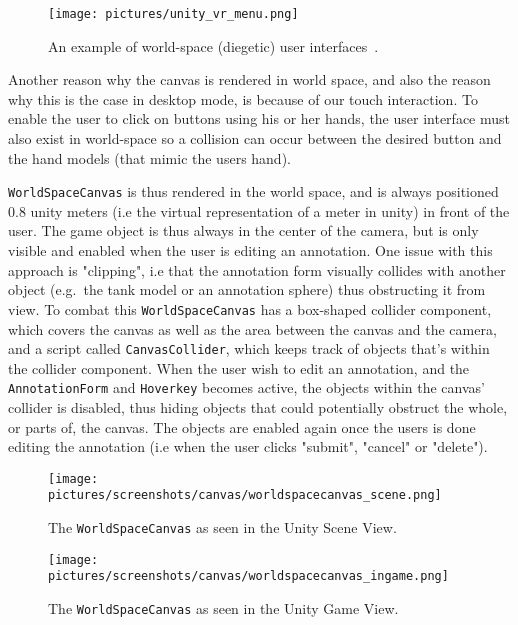 \begin{figure}%
	\texttt{[image: pictures/unity\_vr\_menu.png]}
	\caption[An example of world-space (diegetic) user interfaces]{An example of world-space (diegetic) user interfaces~\citep{Unity}.}
	\label{fig:unity_vr_menu}
\end{figure} 

Another reason why the canvas is rendered in world space, and also the reason why this is the case in desktop mode, is because of our touch interaction.
To enable the user to click on buttons using his or her hands, the user interface must also exist in world-space so a collision can occur between the desired 
button and the hand models (that mimic the users hand). 

\texttt{WorldSpaceCanvas} is thus rendered in the world space, and is always positioned 0.8 unity meters (i.e the virtual representation of a meter in unity) 
in front of the user. The game object is thus always in the center of the camera, but is only visible and enabled when the user is editing an annotation. 
One issue with this approach is "clipping", i.e that the annotation form visually collides with another object (e.g.~the tank model or an annotation sphere) thus
obstructing it from view. To combat this \texttt{WorldSpaceCanvas} has a box-shaped collider component, which covers the canvas as well as the area between the canvas and the camera, 
and a script called \texttt{CanvasCollider}, which keeps track of objects that's within the collider component. When the user wish to edit an annotation, and the 
\texttt{AnnotationForm} and \texttt{Hoverkey} becomes active, the objects within the canvas' collider is disabled, thus hiding objects that could potentially
obstruct the whole, or parts of, the canvas. The objects are enabled again once the users is done editing the annotation (i.e when the user clicks "submit", "cancel" or "delete").

\begin{figure}%
	\texttt{[image: pictures/screenshots/canvas/worldspacecanvas\_scene.png]}
	\caption[The \texttt{WorldSpaceCanvas} as seen in the Unity Scene View]{The \texttt{WorldSpaceCanvas} as seen in the Unity Scene View.}
	\label{fig:worldspacecanvas_scene}
\end{figure} 

\begin{figure}%
	\texttt{[image: pictures/screenshots/canvas/worldspacecanvas\_ingame.png]}
	\caption[The \texttt{WorldSpaceCanvas} as seen in the Unity Game View]{The \texttt{WorldSpaceCanvas} as seen in the Unity Game View.}
	\label{fig:worldspacecanvas_ingame}
\end{figure} 

